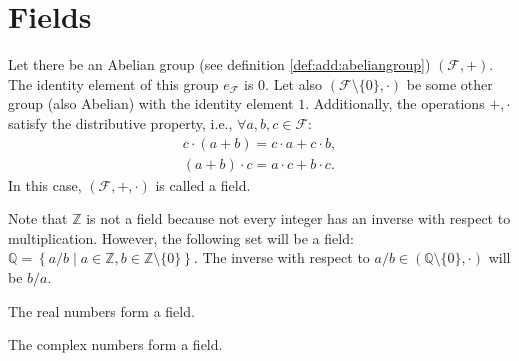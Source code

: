 \section{Fields}
\begin{definition}
  Let there be an Abelian group (see definition
  \ref{def:add:abeliangroup})  
  $(\mathcal{F}, +)$. The identity element of this group $e_\mathcal{F}$ is
  $0$. Let also $(\mathcal{F} \setminus \{0\}, \cdot)$ be some
  other group (also Abelian) with the identity element $1$. Additionally, the operations
  $+,\cdot$ satisfy the distributive property, i.e., $\forall
  a,b,c \in \mathcal{F}$:
  \begin{eqnarray}
  c \cdot \left(a + b\right) = c \cdot a + c \cdot b,
  \nonumber \\
  \left(a + b\right) \cdot c = a \cdot c + b \cdot c.
  \nonumber
  \end{eqnarray}
  In this case, $(\mathcal{F}, +, \cdot)$ is called a field.
  \label{def:field}
\end{definition}

\begin{example}
  Note that $\mathbb{Z}$ is not a field because not every
  integer has an inverse with respect to multiplication. 
  However, the following set will be a field: $\mathbb{Q} =
  \left\{a/b \mid a \in \mathbb{Z}, b \in 
  \mathbb{Z}\setminus\{0\}\right\}$. The inverse with respect to
  $a/b \in \left(\mathbb{Q}\setminus\{0\}, \cdot\right)$ will be $b/a$.
  \label{ex:field_q}
\end{example}

\begin{example}
  The real numbers form a field.
  \label{ex:field_r}
\end{example}

\begin{example}
  The complex numbers form a field.
  \label{ex:field_c}
\end{example}